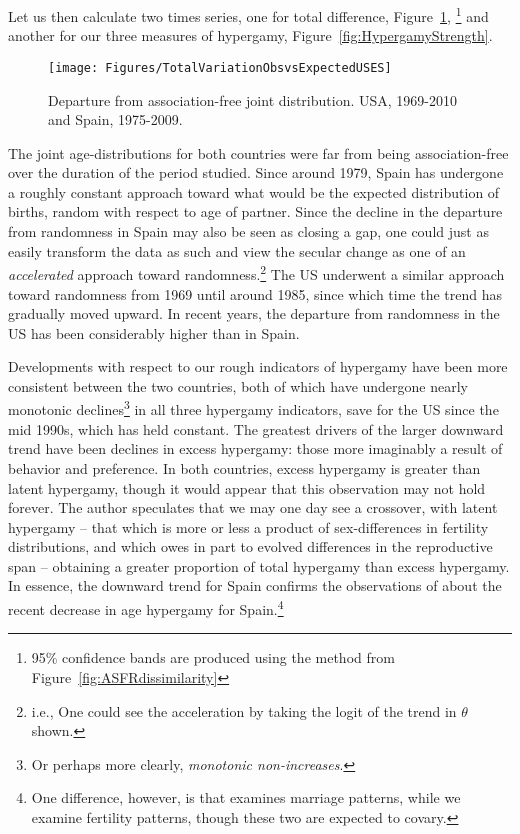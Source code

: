 Let us then calculate two times series, one for total difference,
Figure~\ref{fig:Theta}, \footnote{95\% confidence bands are produced
    using the method from Figure~\ref{fig:ASFRdissimilarity}} and another for
    our three measures of hypergamy, Figure~\ref{fig:HypergamyStrength}.
\begin{figure}[!ht]
  \centering
    \caption{Departure from association-free joint distribution. USA,
    1969-2010 and Spain, 1975-2009.}
     \texttt{[image: Figures/TotalVariationObsvsExpectedUSES]}
     \label{fig:Theta}
\end{figure}
The joint age-distributions for both countries were far from being
association-free over the duration of the period studied. Since around
1979, Spain has undergone a roughly constant approach toward what would be the
expected distribution of births, random with respect to age of
partner. Since the decline in the departure from randomness in Spain 
may also be seen as closing a gap, one could just as
easily transform the data as such and view the secular change as one of an
\textit{accelerated} approach toward randomness.\footnote{i.e., One could see
the acceleration by taking the logit of the trend in $\theta$ shown.} The US
underwent a similar approach toward randomness from 1969 until around 1985,
since which time the trend has gradually moved upward. In recent years, the
departure from randomness in the US has been considerably higher than in Spain.

Developments with respect to our rough indicators of hypergamy have been more
consistent between the two countries, both of which have undergone nearly
monotonic declines\footnote{Or perhaps more clearly, \textit{monotonic
non-increases}.} in all three hypergamy indicators, save for the US since the
mid 1990s, which has held constant. The greatest drivers of the larger downward trend
have been declines in excess hypergamy: those more imaginably a result of
behavior and preference. In both countries, excess hypergamy is greater than
latent hypergamy, though it would appear that this observation may not hold forever. The author
 speculates that we may one day see a crossover, with latent hypergamy -- that
which is more or less a product of sex-differences in fertility distributions,
and which owes in part to evolved differences in the reproductive span --
obtaining a greater proportion of total hypergamy than excess hypergamy. In essence, the
downward trend for Spain confirms the observations of \citet{esteve2009long}
about the recent decrease in age hypergamy for Spain.\footnote{One difference,
however, is that \citet{esteve2009long} examines marriage patterns, while we
examine fertility patterns, though these two are expected to covary.}

